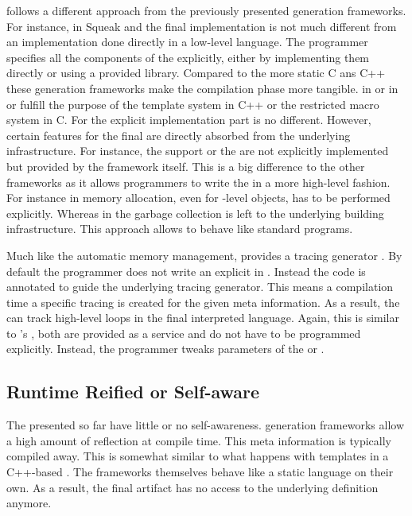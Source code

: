 \PyPy follows a different approach from the previously presented \VM generation frameworks.
For instance, in Squeak and \Jikes the final \VM implementation is not much different from an implementation done directly in a low-level language.
The programmer specifies all the components of the \VM explicitly, either by implementing them directly or using a provided library.
Compared to the more static C ans C++ these \VM generation frameworks make the compilation phase more tangible.
\ST in \Squeak or \Java in \Jikes or \Maxine fulfill the purpose of the template system in C++ or the restricted macro system in C.
For the explicit implementation part \PyPy is no different.
However, certain features for the final \VM are directly absorbed from the underlying \PyPy infrastructure.
For instance, the \JIT support or the \GC are not explicitly implemented but provided by the \PyPy framework itself.
This is a big difference to the other \VM frameworks as it allows programmers to write the \VM in a more high-level fashion.
For instance in \Squeak memory allocation, even for \VM-level objects, has to be performed explicitly.
Whereas in \PyPy the garbage collection is left to the underlying \VM building infrastructure.
This approach allows \RPython \VMs to behave like standard \Python programs.

Much like the automatic memory management, \PyPy provides a tracing \JIT generator \cite{Bolz09a}.
By default the \VM programmer does not write an explicit \JIT in \PyPy.
Instead the \VM code is annotated to guide the underlying tracing \JIT generator.
This means a \VM compilation time a specific tracing \JIT is created for the given meta information.
As a result, the \JIT can track high-level loops in the final interpreted language.
Again, this is similar to \PyPy's \GC, both are provided as a service and do not have to be programmed explicitly.
Instead, the \VM programmer tweaks parameters of the \JIT or \GC.

\subsection{Runtime Reified or Self-aware \VMs}

The \VMs presented so far have little or no self-awareness.
\VM generation frameworks allow a high amount of reflection at \VM compile time.
This meta information is typically compiled away.
This is somewhat similar to what happens with templates in a C++-based \VM.
The \VM frameworks themselves behave like a static language on their own.
As a result, the final \VM artifact has no access to the underlying definition anymore.

